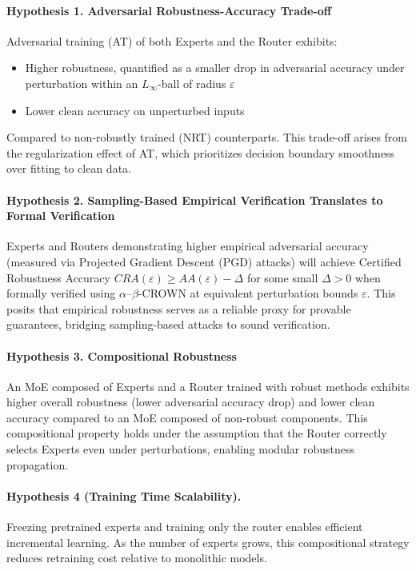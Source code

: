 \documentclass[11pt,a4paper]{article}
\begin{document}
\paragraph{Hypothesis 1. Adversarial Robustness-Accuracy Trade-off}

Adversarial training (AT) of both Experts and the Router exhibits:
\begin{itemize}
    \item Higher robustness, quantified as a smaller drop in adversarial accuracy under perturbation within an $L_\infty$-ball of radius $\varepsilon$
    \item Lower clean accuracy on unperturbed inputs
\end{itemize}

Compared to non-robustly trained (NRT) counterparts. This trade-off arises from the regularization effect of AT, which prioritizes decision boundary smoothness over fitting to clean data.

\paragraph{Hypothesis 2. Sampling-Based Empirical Verification Translates to Formal Verification}

Experts and Routers demonstrating higher empirical adversarial accuracy (measured via Projected Gradient Descent (PGD) attacks) will achieve Certified Robustness Accuracy $CRA(\varepsilon) \geq AA(\varepsilon) - \Delta$ for some small $\Delta > 0$ when formally verified using $\alpha$--$\beta$-CROWN at equivalent perturbation bounds $\varepsilon$. This posits that empirical robustness serves as a reliable proxy for provable guarantees, bridging sampling-based attacks to sound verification.

\paragraph{Hypothesis 3. Compositional Robustness}

An MoE composed of Experts and a Router trained with robust methods exhibits higher overall robustness (lower adversarial accuracy drop) and lower clean accuracy compared to an MoE composed of non-robust components. This compositional property holds under the assumption that the Router correctly selects Experts even under perturbations, enabling modular robustness propagation.

\paragraph{Hypothesis 4 (Training Time Scalability).}
Freezing pretrained experts and training only the router enables efficient incremental learning. As the number of experts grows, this compositional strategy reduces retraining cost relative to monolithic models.
\end{document}

